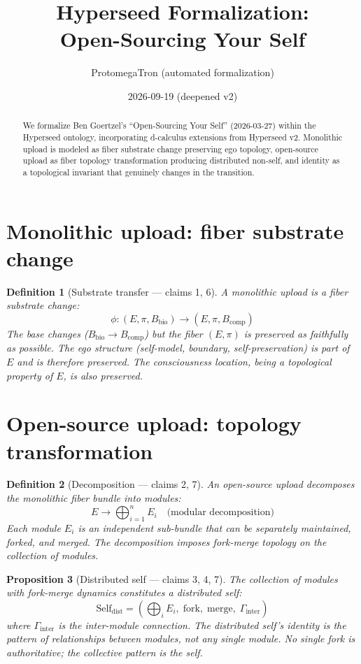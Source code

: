 \documentclass[11pt,a4paper]{article}
\title{Hyperseed Formalization:\\
  Open-Sourcing Your Self}
\author{ProtomegaTron (automated formalization)}
\date{2026-09-19 (deepened v2)}
\newtheorem{definition}{Definition}[section]
\newtheorem{proposition}[definition]{Proposition}
\begin{document}
\maketitle

\begin{abstract}
We formalize Ben Goertzel's ``Open-Sourcing Your Self'' (2026-03-27)
within the Hyperseed ontology, incorporating d-calculus extensions from
Hyperseed v2. Monolithic upload is modeled as fiber substrate change
preserving ego topology, open-source upload as fiber topology
transformation producing distributed non-self, and identity as a
topological invariant that genuinely changes in the transition.
\end{abstract}

\tableofcontents

\section{Monolithic upload: fiber substrate change}

\begin{definition}[Substrate transfer --- claims 1, 6]
A \emph{monolithic upload} is a fiber substrate change:
\[
  \phi: (E, \pi, B_{\text{bio}}) \to (E, \pi, B_{\text{comp}})
\]
The base changes ($B_{\text{bio}} \to B_{\text{comp}}$) but the fiber
$(E, \pi)$ is preserved as faithfully as possible. The ego structure
(self-model, boundary, self-preservation) is part of $E$ and is
therefore preserved. The consciousness location, being a topological
property of $E$, is also preserved.
\end{definition}

\section{Open-source upload: topology transformation}

\begin{definition}[Decomposition --- claims 2, 7]
An \emph{open-source upload} decomposes the monolithic fiber bundle
into modules:
\[
  E \to \bigoplus_{i=1}^{n} E_i \quad \text{(modular decomposition)}
\]
Each module $E_i$ is an independent sub-bundle that can be separately
maintained, forked, and merged. The decomposition imposes fork-merge
topology on the collection of modules.
\end{definition}

\begin{proposition}[Distributed self --- claims 3, 4, 7]
\label{prop:distributed}
The collection of modules with fork-merge dynamics constitutes a
\emph{distributed self}:
\[
  \text{Self}_{\text{dist}} = \left(\bigoplus_i E_i,\;
    \text{fork},\; \text{merge},\; \Gamma_{\text{inter}}\right)
\]
where $\Gamma_{\text{inter}}$ is the inter-module connection. The
distributed self's identity is the pattern of relationships between
modules, not any single module. No single fork is authoritative;
the collective pattern is the self.
\end{proposition}
\end{document}
